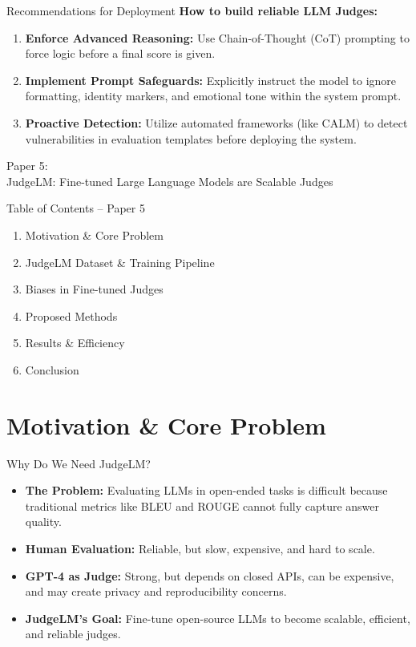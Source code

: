 \documentclass[10pt]{beamer}
\begin{document}
\begin{frame}{Recommendations for Deployment}
  \textbf{How to build reliable LLM Judges:}
  \vspace{0.3cm}
  \begin{enumerate}
      \item \textbf{Enforce Advanced Reasoning:} Use Chain-of-Thought (CoT) prompting to force logic before a final score is given.
      \item \textbf{Implement Prompt Safeguards:} Explicitly instruct the model to ignore formatting, identity markers, and emotional tone within the system prompt.
      \item \textbf{Proactive Detection:} Utilize automated frameworks (like CALM) to detect vulnerabilities in evaluation templates \alert{before} deploying the system.
  \end{enumerate}
\end{frame}


\begin{frame}[standout]
	\hypertarget{paper5}{}
	\Large Paper 5:\\JudgeLM: Fine-tuned Large Language Models are Scalable Judges
\end{frame}

\begin{frame}{Table of Contents -- Paper 5}
	\begin{enumerate}
		\item Motivation \& Core Problem
		\item JudgeLM Dataset \& Training Pipeline
		\item Biases in Fine-tuned Judges
		\item Proposed Methods
		\item Results \& Efficiency
		\item Conclusion
	\end{enumerate}
\end{frame}

\section{Motivation \& Core Problem}

\begin{frame}{Why Do We Need JudgeLM?}
	\begin{itemize}
		\item \textbf{The Problem:} Evaluating LLMs in open-ended tasks is difficult because traditional metrics like BLEU and ROUGE cannot fully capture answer quality.
		\item \textbf{Human Evaluation:} Reliable, but slow, expensive, and hard to scale.
		\item \textbf{GPT-4 as Judge:} Strong, but depends on closed APIs, can be expensive, and may create privacy and reproducibility concerns.
		\item \textbf{JudgeLM's Goal:} Fine-tune open-source LLMs to become scalable, efficient, and reliable judges.
	\end{itemize}
\end{frame}
\end{document}

